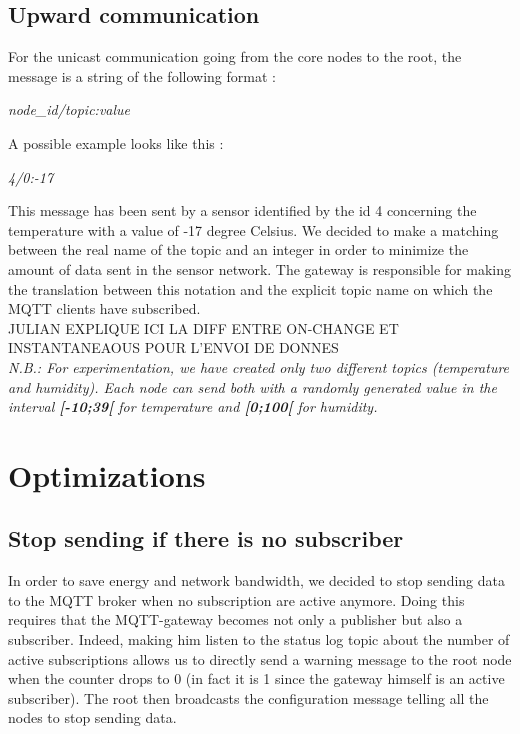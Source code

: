 \documentclass{article}
\begin{document}
\subsection{Upward communication}

For the unicast communication going from the core nodes to the root, the message is a string of the following format : \\
\begin{center}
\centerline{\textit{node\_id/topic:value}}
\end{center}
A possible example looks like this : \\
\begin{center}
\centerline{\textit{4/0:-17}}
\end{center}
This message has been sent by a sensor identified by the id 4 concerning the temperature with a value of -17 degree Celsius. We decided to make a matching between the real name of the topic and an integer in order to minimize the amount of data sent in the sensor network. The gateway is responsible for making the translation between this notation and the explicit topic name on which the MQTT clients have subscribed. \\
JULIAN EXPLIQUE ICI LA DIFF ENTRE ON-CHANGE ET INSTANTANEAOUS POUR L'ENVOI DE DONNES
\\
\textit{N.B.: For experimentation, we have created only two different topics (temperature and humidity). Each node can send both with a randomly generated value in the interval \textbf{[-10;39[} for temperature and \textbf{[0;100[} for humidity.}

\section{Optimizations}

\subsection{Stop sending if there is no subscriber}

In order to save energy and network bandwidth, we decided to stop sending data to the MQTT broker when no subscription are active anymore. Doing this requires that the MQTT-gateway becomes not only a publisher but also a subscriber. Indeed, making him listen to the status log topic about the number of active subscriptions allows us to directly send a warning message to the root node when the counter drops to 0 (in fact it is 1 since the gateway himself is an active subscriber). The root then broadcasts the configuration message telling all the nodes to stop sending data.
\end{document}
